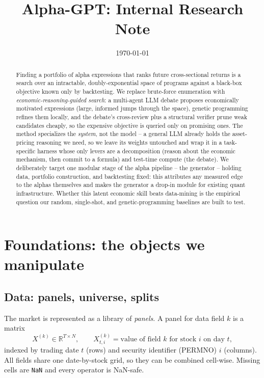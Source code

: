 \documentclass[11pt]{article}
\title{\textbf{Alpha-GPT: Internal Research Note}}
\date{\today}
\theoremstyle{definition}
\theoremstyle{plain}
\theoremstyle{remark}
\newcommand{\R}{\mathbb{R}}
\begin{document}
\maketitle

\begin{abstract}
Finding a portfolio of alpha expressions that ranks future cross-sectional returns is a search
over an intractable, doubly-exponential space of programs against a black-box objective known
only by backtesting. We replace brute-force enumeration with \emph{economic-reasoning-guided
search}: a multi-agent LLM debate proposes economically motivated expressions (large, informed
jumps through the space), genetic programming refines them locally, and the debate's cross-review
plus a structural verifier prune weak candidates cheaply, so the expensive objective is queried
only on promising ones. The method specializes the \emph{system}, not the model -- a general LLM
already holds the asset-pricing reasoning we need, so we leave its weights untouched and wrap it
in a task-specific harness whose only levers are a decomposition (reason about the economic
mechanism, then commit to a formula) and test-time compute (the debate). We deliberately target
one modular stage of the alpha pipeline -- the generator -- holding data, portfolio construction,
and backtesting fixed: this attributes any measured edge to the alphas themselves and makes the
generator a drop-in module for existing quant infrastructure. Whether this latent economic skill
beats data-mining is the empirical question our random, single-shot, and genetic-programming
baselines are built to test.
\end{abstract}

\section{Foundations: the objects we manipulate}
\label{sec:foundations}

\subsection{Data: panels, universe, splits}
\label{sec:data}

The market is represented as a library of \emph{panels}. A panel for data field $k$
is a matrix
\[
X^{(k)} \in \R^{T \times N}, \qquad X^{(k)}_{t,i} = \text{value of field } k \text{ for stock } i \text{ on day } t,
\]
indexed by trading date $t$ (rows) and security identifier (PERMNO) $i$ (columns).
All fields share one date-by-stock grid, so they can be combined cell-wise. Missing
cells are \texttt{NaN} and every operator is NaN-safe.
\end{document}
